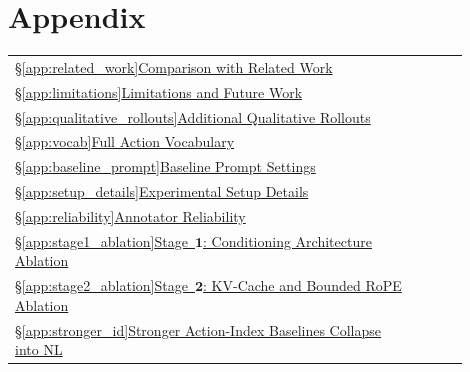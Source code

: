 \newpage
\section{Appendix}
\label{sec:appendix}

{\small\setlength{\tabcolsep}{0pt}%
\begin{tabular}{@{}p{0.90\linewidth}r@{}}
  \hyperref[app:related_work]{\S\ref*{app:related_work}\enspace Comparison with Related Work}                                               & \pageref{app:related_work}    \\[2pt]
  \hyperref[app:limitations]{\S\ref*{app:limitations}\enspace Limitations and Future Work}                                                   & \pageref{app:limitations}     \\[2pt]
  \hyperref[app:qualitative_rollouts]{\S\ref*{app:qualitative_rollouts}\enspace Additional Qualitative Rollouts}                                                                    & \pageref{app:qualitative_rollouts}           \\[2pt]
  \hyperref[app:vocab]{\S\ref*{app:vocab}\enspace Full Action Vocabulary}                                                                    & \pageref{app:vocab}           \\[2pt]
  \hyperref[app:baseline_prompt]{\S\ref*{app:baseline_prompt}\enspace Baseline Prompt Settings}                                              & \pageref{app:baseline_prompt} \\[2pt]
  \hyperref[app:setup_details]{\S\ref*{app:setup_details}\enspace Experimental Setup Details}                                                & \pageref{app:setup_details}   \\[2pt]
  \hyperref[app:reliability]{\S\ref*{app:reliability}\enspace Annotator Reliability}                                                         & \pageref{app:reliability}     \\[2pt]
  \hyperref[app:stage1_ablation]{\S\ref*{app:stage1_ablation}\enspace Stage~$\mathbf{1}$: Conditioning Architecture Ablation}                & \pageref{app:stage1_ablation} \\[2pt]
  \hyperref[app:stage2_ablation]{\S\ref*{app:stage2_ablation}\enspace Stage~$\mathbf{2}$: KV-Cache and Bounded RoPE Ablation}                & \pageref{app:stage2_ablation} \\[2pt]
  \hyperref[app:stronger_id]{\S\ref*{app:stronger_id}\enspace Stronger Action-Index Baselines Collapse into NL}                              & \pageref{app:stronger_id}     \\[2pt]

\end{tabular}}
